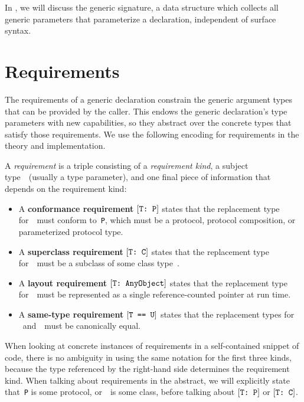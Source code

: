 \documentclass[../generics]{subfiles}
\begin{document}
In , we will discuss the generic signature, a data structure which collects all generic parameters that parameterize a declaration, independent of surface syntax.

\section{Requirements}\label{sec:requirements}

The requirements of a generic declaration constrain the generic argument types that can be provided by the caller. This endows the generic declaration's type parameters with new capabilities, so they abstract over the concrete types that satisfy those requirements. We use the following encoding for requirements in the theory and implementation.

\begin{definition}\label{requirement def}
A \emph{requirement} is a triple consisting of a \emph{requirement kind}, a subject type~\tT\ (usually a type parameter), and one final piece of information that depends on the requirement kind:
\begin{itemize}
\item A \textbf{conformance requirement} $[\texttt{T:~P}]$ states that the replacement type for~\tT\ must conform to~\texttt{P}, which must be a protocol, protocol composition, or parameterized protocol type.
\item A \textbf{superclass requirement} $[\texttt{T:~C}]$ states that the replacement type for~\tT\ must be a subclass of some class type~\tC.
\item A \textbf{layout requirement} $[\texttt{T:~AnyObject}]$ states that the replacement type for~\tT\ must be represented as a single reference-counted pointer at run time.
\item A \textbf{same-type requirement} $[\texttt{T == U}]$ states that the replacement types for \tT~and~\tU\ must be canonically equal.
\end{itemize}
\end{definition}

When looking at concrete instances of requirements in a self-contained snippet of code, there is no ambiguity in using the same notation for the first three kinds, because the type referenced by the right-hand side determines the requirement kind. When talking about requirements in the abstract, we will explicitly state that~\texttt{P} is some protocol, or~\tC\ is some class, before talking about $[\texttt{T:~P}]$ or $[\texttt{T:~C}]$.
\end{document}
